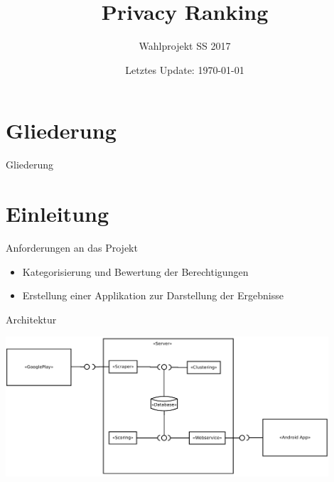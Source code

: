 \documentclass[compress,t]{beamer}
\title{Privacy Ranking}
\subtitle{Wahlprojekt SS 2017}
\date{Letztes Update: \today}
\institute{Studienbereich Informatik\\Hochschule {RheinMain}}
\begin{document}
\maketitle


\section*{Gliederung}
\begin{frame}{Gliederung}
    \tableofcontents[hideallsubsections]
\end{frame}



\section{Einleitung}

\begin{frame}{Anforderungen an das Projekt}

    \begin{itemize}
        \item Kategorisierung und Bewertung der Berechtigungen
        \item Erstellung einer Applikation zur Darstellung der Ergebnisse
    \end{itemize}


\end{frame}

\begin{frame}{Architektur}

    \begin{center}
        \includegraphics[width=0.9\textwidth]{img/architecture.png}
    \end{center}

\end{frame}
\end{document}
